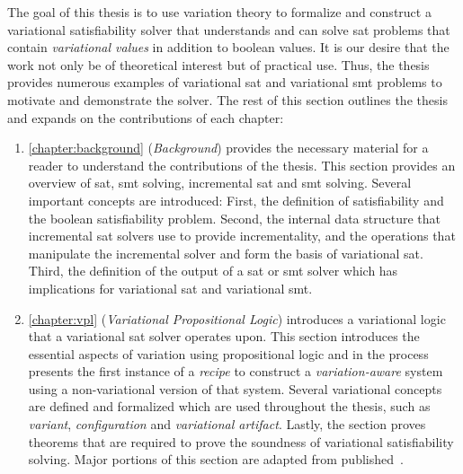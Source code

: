 \label{section:contributions}
%
The goal of this thesis is to use variation theory to formalize and construct a
variational satisfiability solver that understands and can solve \ac{sat}
problems that contain \emph{variational values} in addition to boolean values.
It is our desire that the work not only be of theoretical interest but of
practical use. Thus, the thesis provides numerous examples of variational
\ac{sat} and variational \ac{smt} problems to motivate and demonstrate the
solver. The rest of this section outlines the thesis and expands on the
contributions of each chapter:

  \begin{enumerate}
  \item \autoref{chapter:background} (\emph{Background}) provides the necessary
    material for a reader to understand the contributions of the thesis. This
    section provides an overview of \acl{sat}, \acl{smt} solving, incremental
    \ac{sat} and \ac{smt} solving. Several important concepts are introduced:
    First, the definition of satisfiability and the boolean satisfiability
    problem. Second, the internal data structure that incremental \ac{sat}
    solvers use to provide incrementality, and the operations that manipulate
    the incremental solver and form the basis of variational \acl{sat}. Third,
    the definition of the output of a \ac{sat} or \ac{smt} solver which has
    implications for variational \acl{sat} and variational \ac{smt}.

  \item \autoref{chapter:vpl} (\emph{Variational Propositional Logic})
    introduces a variational logic that a variational \ac{sat} solver operates
    upon. This section introduces the essential aspects of variation using
    propositional logic and in the process presents the first instance of a
    \emph{\recipe{} recipe} to construct a \emph{variation-aware} system using a
    non-variational version of that system. Several variational concepts are
    defined and formalized which are used throughout the thesis, such as
    \emph{variant}, \emph{configuration} and \emph{variational artifact}.
    Lastly, the section proves theorems that are required to prove the soundness
    of variational satisfiability solving. Major portions of this section are
    adapted from published~\cite{YWT:SPLC20}.


\end{enumerate}
